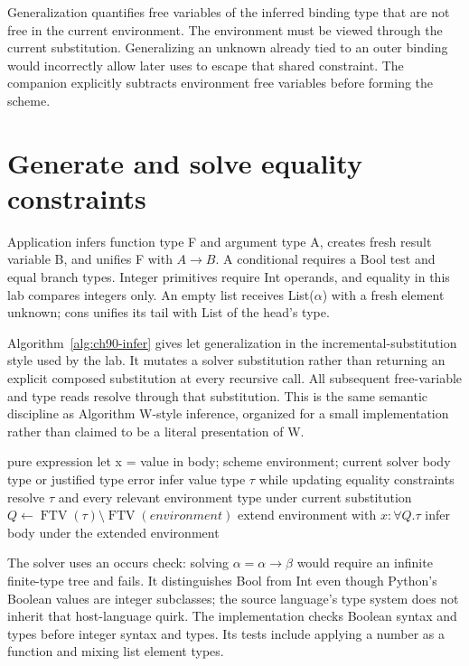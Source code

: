 Generalization quantifies free variables of the inferred binding type that are not free in the current environment.
The environment must be viewed through the current substitution.
Generalizing an unknown already tied to an outer binding would incorrectly allow later uses to escape that shared constraint.
The companion explicitly subtracts environment free variables before forming the scheme.

\section{Generate and solve equality constraints}
\label{sec:ch90-unification}
Application infers function type F and argument type A, creates fresh result variable B, and unifies F with $A\to B$.
A conditional requires a Bool test and equal branch types.
Integer primitives require Int operands, and equality in this lab compares integers only.
An empty list receives List($\alpha$) with a fresh element unknown; cons unifies its tail with List of the head's type.

Algorithm~\ref{alg:ch90-infer} gives let generalization in the incremental-substitution style used by the lab.
It mutates a solver substitution rather than returning an explicit composed substitution at every recursive call.
All subsequent free-variable and type reads resolve through that substitution.
This is the same semantic discipline as Algorithm W-style inference, organized for a small implementation rather than claimed to be a literal presentation of W.

\begin{algorithm}[htbp]
\caption{Infer a nonrecursive let with environment-aware generalization.}
\label{alg:ch90-infer}
\begin{pseudocode}
\Require pure expression let x = value in body; scheme environment; current solver
\Ensure body type or justified type error
\State infer value type $\tau$ while updating equality constraints
\State resolve $\tau$ and every relevant environment type under current substitution
\State $Q\gets\operatorname{FTV}(\tau)\setminus\operatorname{FTV}(environment)$
\State extend environment with $x:\forall Q.\tau$
\State infer body under the extended environment
\end{pseudocode}
\end{algorithm}

The solver uses an occurs check: solving $\alpha=\alpha\to\beta$ would require an infinite finite-type tree and fails.
It distinguishes Bool from Int even though Python's Boolean values are integer subclasses; the source language's type system does not inherit that host-language quirk.
The implementation checks Boolean syntax and types before integer syntax and types.
Its tests include applying a number as a function and mixing list element types.

